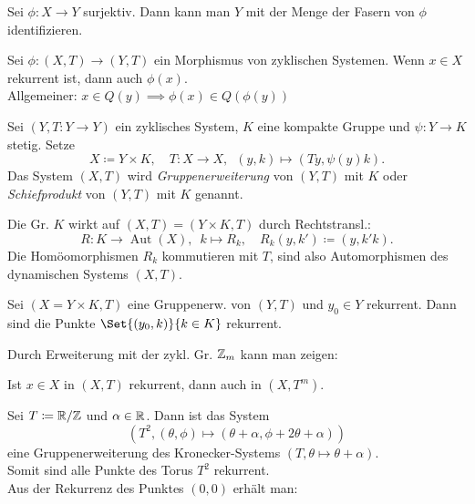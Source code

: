 \documentclass{cheat-sheet}
\DeclareMathOperator{\Aut}{Aut} %
\begin{document}
\begin{bem}
  Sei $\phi : X \to Y$ surjektiv. Dann kann man $Y$ mit der Menge der Fasern von $\phi$ identifizieren.
\end{bem}

\begin{thm}
  Sei $\phi : (X, T) \to (Y, T)$ ein Morphismus von zyklischen Systemen.
  Wenn $x \in X$ rekurrent ist, dann auch $\phi(x)$. \\
  Allgemeiner: $x \in Q(y) \implies \phi(x) \in Q(\phi(y))$
\end{thm}

\begin{defn}
  Sei $(Y, T : Y \to Y)$ ein zyklisches System, $K$ eine kompakte Gruppe und $\psi : Y \to K$ stetig. Setze
  \[
    X \coloneqq Y \times K, \quad
    T : X \to X, \enspace (y, k) \mapsto (Ty, \psi(y)k).
  \]
  Das System $(X, T)$ wird \emph{Gruppenerweiterung} von $(Y, T)$ mit $K$ oder \emph{Schiefprodukt} von $(Y, T)$ mit $K$ genannt.
\end{defn}

\begin{bem}
  Die Gr. $K$ wirkt auf $(X, T) = (Y \!\times\! K, T)$ durch Rechtstransl.:
  \[
    R : K \to \Aut(X), \enspace k \mapsto R_k, \quad
    R_k(y,k') \coloneqq (y,k'k).
  \]
  Die Homöomorphismen $R_k$ kommutieren mit $T$, sind also Automorphismen des dynamischen Systems $(X, T)$.
\end{bem}

\begin{thm}
  Sei $(X \!=\! Y \!\times\! K, T)$ eine Gruppenerw. von $(Y, T)$ und $y_0 \in Y$ rekurrent.
  Dann sind die Punkte $\Set{(y_0, k)}{k \in K}$ rekurrent.
\end{thm}

\begin{bem}
  Durch Erweiterung mit der zykl. Gr. $\mathbb{Z}_m$ kann man zeigen:
\end{bem}

\begin{prop}
  Ist $x \in X$ in $(X, T)$ rekurrent, dann auch in $(X, T^m)$.
\end{prop}

\begin{bsp}
  Sei $T \coloneqq \mathbb{R} / \mathbb{Z}$ und $\alpha \in \mathbb{R}$. Dann ist das System
  \[ (T^2, (\theta, \phi) \mapsto (\theta + \alpha, \phi + 2 \theta + \alpha)) \]
  eine Gruppenerweiterung des Kronecker-Systems $(T, \theta \mapsto \theta + \alpha)$. \\
  Somit sind alle Punkte des Torus $T^2$ rekurrent. \\
  Aus der Rekurrenz des Punktes $(0, 0)$ erhält man:
\end{bsp}
\end{document}
